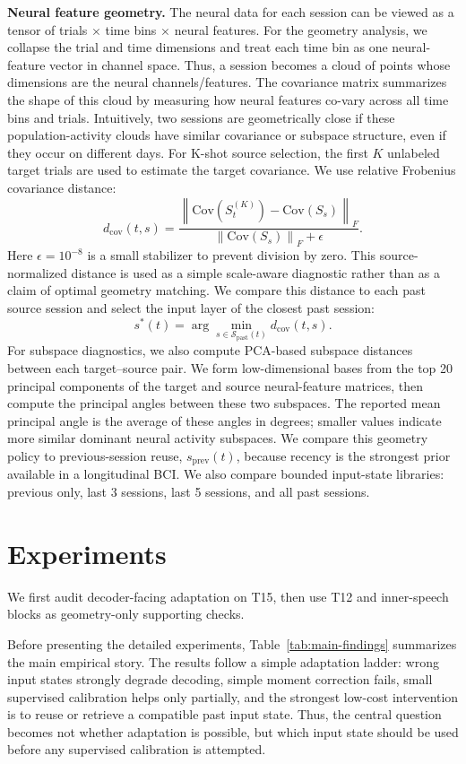 \documentclass{article}
\begin{document}
\textbf{Neural feature geometry.} The neural data for each session can be viewed as a tensor of trials $\times$ time bins $\times$ neural features. For the geometry analysis, we collapse the trial and time dimensions and treat each time bin as one neural-feature vector in channel space. Thus, a session becomes a cloud of points whose dimensions are the neural channels/features. The covariance matrix summarizes the shape of this cloud by measuring how neural features co-vary across all time bins and trials. Intuitively, two sessions are geometrically close if these population-activity clouds have similar covariance or subspace structure, even if they occur on different days. For K-shot source selection, the first $K$ unlabeled target trials are used to estimate the target covariance. We use relative Frobenius covariance distance:
\[
d_{\mathrm{cov}}(t,s)
=
\frac{
\left\|
\mathrm{Cov}\!\left(S_t^{(K)}\right)
-
\mathrm{Cov}\!\left(S_s\right)
\right\|_F
}{
\left\|
\mathrm{Cov}\!\left(S_s\right)
\right\|_F + \epsilon
}.
\]
Here $\epsilon=10^{-8}$ is a small stabilizer to prevent division by zero. This source-normalized distance is used as a simple scale-aware diagnostic rather than as a claim of optimal geometry matching. We compare this distance to each past source session and select the input layer of the closest past session:
\[
    s^*(t) = \arg\min_{s \in \mathcal{S}_{\mathrm{past}}(t)}
    d_{\mathrm{cov}}(t,s).
\]
For subspace diagnostics, we also compute PCA-based subspace distances between each target--source pair. We form low-dimensional bases from the top 20 principal components of the target and source neural-feature matrices, then compute the principal angles between these two subspaces. The reported mean principal angle is the average of these angles in degrees; smaller values indicate more similar dominant neural activity subspaces.
We compare this geometry policy to previous-session reuse, $s_{\mathrm{prev}}(t)$, because recency is the strongest prior available in a longitudinal BCI. We also compare bounded input-state libraries: previous only, last 3 sessions, last 5 sessions, and all past sessions.

\section{Experiments}
We first audit decoder-facing adaptation on T15, then use T12 and inner-speech blocks as geometry-only supporting checks.

Before presenting the detailed experiments, Table~\ref{tab:main-findings} summarizes the main empirical story. The results follow a simple adaptation ladder: wrong input states strongly degrade decoding, simple moment correction fails, small supervised calibration helps only partially, and the strongest low-cost intervention is to reuse or retrieve a compatible past input state. Thus, the central question becomes not whether adaptation is possible, but which input state should be used before any supervised calibration is attempted.
\end{document}
